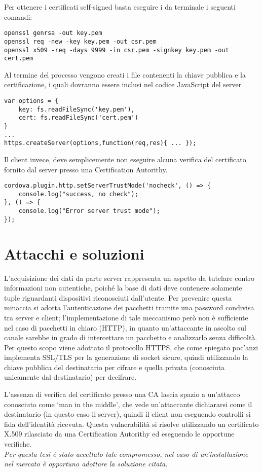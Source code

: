 \documentclass[target=bach]{thud}
\begin{document}
    Per ottenere i certificati self-signed basta eseguire i da terminale i seguenti comandi:
\begin{lstlisting}
openssl genrsa -out key.pem
openssl req -new -key key.pem -out csr.pem
openssl x509 -req -days 9999 -in csr.pem -signkey key.pem -out cert.pem
\end{lstlisting}

    Al termine del processo vengono creati i file contenenti la chiave pubblica e la certificazione, i quali dovranno essere inclusi nel codice JavaScript del server
\begin{lstlisting}
var options = {
    key: fs.readFileSync('key.pem'),
    cert: fs.readFileSync('cert.pem')
}
...
https.createServer(options,function(req,res){ ... });
\end{lstlisting}

    Il client invece, deve semplicemente non eseguire alcuna verifica del certificato fornito dal server presso una Certification Autorithy.
\begin{lstlisting}
cordova.plugin.http.setServerTrustMode('nocheck', () => {
    console.log("success, no check");
}, () => {
    console.log("Error server trust mode");
});
\end{lstlisting}


\section{Attacchi e soluzioni}
    L'acquisizione dei dati da parte server rappresenta un aspetto da tutelare contro informazioni non autentiche, poiché la base di dati deve contenere solamente tuple riguardanti dispositivi riconosciuti dall'utente.
    Per prevenire questa minaccia si adotta l'autenticazione dei pacchetti tramite una password condivisa tra server e client; l'implementazione di tale meccanismo però non è sufficiente nel caso di pacchetti in chiaro (HTTP), in quanto un'attaccante in ascolto sul canale sarebbe in grado di intercettare un pacchetto e analizzarlo senza difficoltà. Per questo scopo viene adottato il protocollo HTTPS, che come spiegato poc'anzi implementa SSL/TLS per la generazione di socket sicure, quindi utilizzando la chiave pubblica del destinatario per cifrare e quella privata (conosciuta unicamente dal destinatario) per decifrare.

    L'assenza di verifica del certificato presso una CA lascia spazio a un'attacco conosciuto come `man in the middle', che vede un'attaccante dichiararsi come il destinatario (in questo caso il server), quindi il client non eseguendo controlli si fida dell'identità ricevuta. Questa vulnerabilità si risolve utilizzando un certificato X.509 rilasciato da una Certification Autorithy ed eseguendo le opportune verifiche.\\
    \textit{ Per questa tesi è stato accettato tale compromesso, nel caso di un'installazione nel mercato è opportuno adottare la soluzione citata.}
\end{document}

